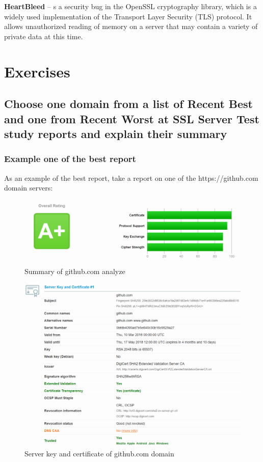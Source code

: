 \documentclass[14pt,a4paper,report]{report}
\begin{document}
\textbf{HeartBleed} -- s a security bug in the OpenSSL cryptography library, which is a widely used implementation of the Transport Layer Security (TLS) protocol. It allows unauthorized reading of memory on a server that may contain a variety of private data at this time.

\clearpage

\section{Exercises}

\subsection{Choose one domain from a list of Recent Best and one from Recent Worst at SSL Server Test study reports and explain their summary}

\subsubsection{Example one of the best report}

As an example of the best report, take a report on one of the https://github.com domain servers:

\begin{figure}[h!]
	\centering
	\includegraphics[scale = 0.50]{images/1.png}
	\caption{Summary of github.com analyze}
\end{figure}

\begin{figure}[h!]
	\centering
	\includegraphics[scale = 0.53]{images/2.png}
	\caption{Server key and certificate of github.com domain}
\end{figure}
\end{document}
